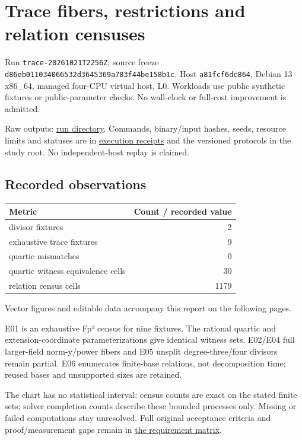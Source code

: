 \documentclass[
  10pt,
  letterpaper,
  landscape]{article}
\author{}
\date{}
\begin{document}
\section{Trace fibers, restrictions and relation
censuses}\label{trace-fibers-restrictions-and-relation-censuses}

Run \texttt{trace-20261021T2256Z}; source freeze
\texttt{d86eb011034066532d3645369a783f44be158b1c}. Host
\texttt{a81fcf6dc864}, Debian 13 x86\_64, managed four-CPU virtual host,
L0. Workloads use public synthetic fixtures or public-parameter checks.
No wall-clock or full-cost improvement is admitted.

Raw outputs: \href{../../../execution-v1/runs/trace-20261021T2256Z/}{run
directory}. Commands, binary/input hashes, seeds, resource limits and
statuses are in \href{../../../execution-v1/}{execution receipts} and
the versioned protocols in the study root. No independent-host replay is
claimed.

\subsection{Recorded observations}\label{recorded-observations}

\begin{longtable}[]{@{}lr@{}}
\toprule\noalign{}
Metric & Count / recorded value \\
\midrule\noalign{}
\endhead
\bottomrule\noalign{}
\endlastfoot
divisor fixtures & 2 \\
exhaustive trace fixtures & 9 \\
quartic mismatches & 0 \\
quartic witness equivalence cells & 30 \\
relation census cells & 1179 \\
\end{longtable}

Vector figures and editable data accompany this report on the following pages.

E01 is an exhaustive Fp² census for nine fixtures. The rational quartic
and extension-coordinate parameterizations give identical witness sets.
E02/E04 full larger-field norm-y/power fibers and E05 unsplit
degree-three/four divisors remain partial. E06 enumerates finite-base
relations, not decomposition time; reused bases and unsupported sizes
are retained.

The chart has no statistical interval: census counts are exact on the
stated finite sets; solver completion counts describe these bounded
processes only. Missing or failed computations stay unresolved. Full
original acceptance criteria and proof/measurement gaps remain in
\href{../../../EXPERIMENTS.md}{the requirement matrix}.
\end{document}

